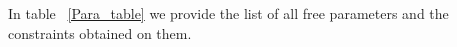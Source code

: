 \documentclass[12pt, a4 paper]{mnras}
\newcommand{\Vasu}[1]{{\color{purple}#1}}
\begin{document}
In table ~\ref{Para_table} we provide the list of all free parameters and the constraints obtained on them.
\newline

\end{document}
